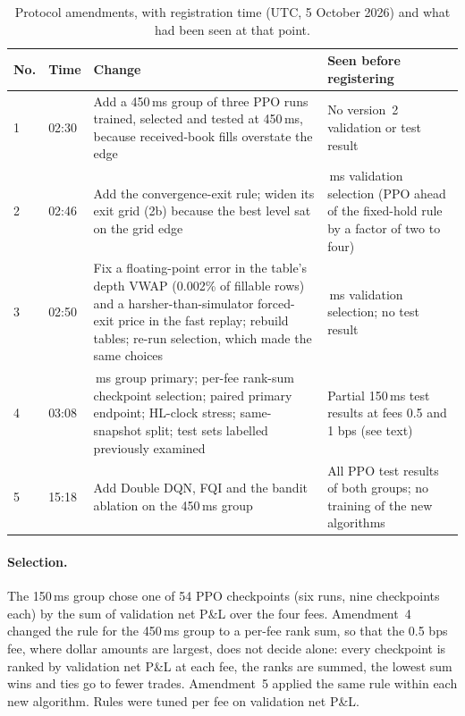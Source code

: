 \documentclass[12pt,a4paper]{article}
\DeclareRobustCommand{\bps}{\ifmmode\,\text{bps}\else\,bps\fi}
\begin{document}
\begin{table}[!htbp]
\centering
\caption{Protocol amendments, with registration time (UTC, 5 October 2026) and what had been
seen at that point.}
\label{tab:amend}
\small
\begin{tabularx}{\textwidth}{@{}l l >{\raggedright\arraybackslash}X >{\raggedright\arraybackslash}X@{}}
\toprule
No. & Time & Change & Seen before registering \\
\midrule
1 & 02:30 & Add a 450\,ms group of three PPO runs trained, selected and tested at 450\,ms,
because received-book fills overstate the edge & No version~2 validation or test result \\
2 & 02:46 & Add the convergence-exit rule; widen its exit grid (2b) because the best level
sat on the grid edge & 150\,ms validation selection (PPO ahead of the fixed-hold rule by a
factor of two to four) \\
3 & 02:50 & Fix a floating-point error in the table's depth VWAP (0.002\% of fillable rows)
and a harsher-than-simulator forced-exit price in the fast replay; rebuild tables; re-run
selection, which made the same choices & 150\,ms validation selection; no test result \\
4 & 03:08 & 450\,ms group primary; per-fee rank-sum checkpoint selection; paired primary
endpoint; HL-clock stress; same-snapshot split; test sets labelled previously examined &
Partial 150\,ms test results at fees 0.5 and 1\bps{} (see text) \\
5 & 15:18 & Add Double DQN, FQI and the bandit ablation on the 450\,ms group & All PPO test
results of both groups; no training of the new algorithms \\
\bottomrule
\end{tabularx}
\end{table}

\paragraph{Selection.} The 150\,ms group chose one of 54 PPO checkpoints (six runs, nine
checkpoints each) by the sum of validation net P\&L over the four fees. Amendment~4 changed
the rule for the 450\,ms group to a per-fee rank sum, so that the 0.5\bps{} fee, where dollar
amounts are largest, does not decide alone: every checkpoint is ranked by validation net P\&L
at each fee, the ranks are summed, the lowest sum wins and ties go to fewer trades. Amendment~5
applied the same rule within each new algorithm. Rules were tuned per fee on validation net
P\&L.
\end{document}
